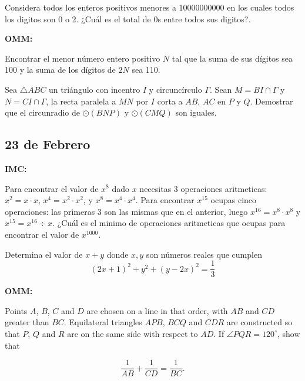 \documentclass[11pt]{scrartcl}
\begin{document}
\begin{problem} [IMC 2014/11]
    Considera todos los enteros positivos menores a 10000000000 en los cuales todos los digitos son 0 o 2. ¿Cuál es el total de 0s entre todos sus digitos?. 
\end{problem}

\textbf{OMM:}
\begin{problem} [OMCC 2008/1]
    
    Encontrar el menor número entero positivo $ N$ tal que la suma de sus dígitos sea 100 y la suma de los dígitos de $ 2N$ sea 110.
\end{problem}

\begin{problem} [OMCC 2016/6]
    
    Sea $\triangle ABC$ un triángulo con incentro $I$ y circuncírculo $\Gamma$. Sean $M=BI\cap \Gamma$ y $N=CI\cap \Gamma$, la recta paralela a $MN$ por $I$ corta a $AB$, $AC$ en $P$ y $Q$. Demostrar que el circunradio de $\odot (BNP)$ y $\odot (CMQ)$ son iguales.
\end{problem}

\newpage
\subsection{23 de Febrero}
\textbf{IMC:}

\begin{problem} [IMC 2002/3]
    Para encontrar el valor de $x^8$ dado $x$ necesitas 3 operaciones aritmeticas: $x^2=x \cdot x$, $x^4=x^2\cdot x^2$, y $x^8=x^4\cdot x^4$. Para encontrar $x^{15}$ ocupas cinco operaciones: las primeras 3 son las mismas que en el anterior, luego $x^{16}=x^8 \cdot x^8$ y $x^{15}=x^{16}\div x$. ¿Cuál es el minimo de operaciones aritmeticas que ocupas para encontrar el valor de $x^{1000}$.
\end{problem}

\begin{problem} [IMC 2006/9]
    Determina el valor de $x+y$ donde $x, y$ son números reales que cumplen 
    \[(2x+1)^2+y^2+(y-2x)^2 =\frac 13\]
\end{problem}

\textbf{OMM:}
\begin{problem} [OMCC 2014/5]
    Points $A$, $B$, $C$ and $D$ are chosen on a line in that order, with $AB$ and $CD$ greater than $BC$. Equilateral triangles $APB$, $BCQ$ and $CDR$ are constructed so that $P$, $Q$ and $R$ are on the same side with respect to $AD$. If $\angle PQR=120^\circ$, show that

\[\frac{1}{AB}+\frac{1}{CD}=\frac{1}{BC}.\]
\end{problem}
\end{document}

